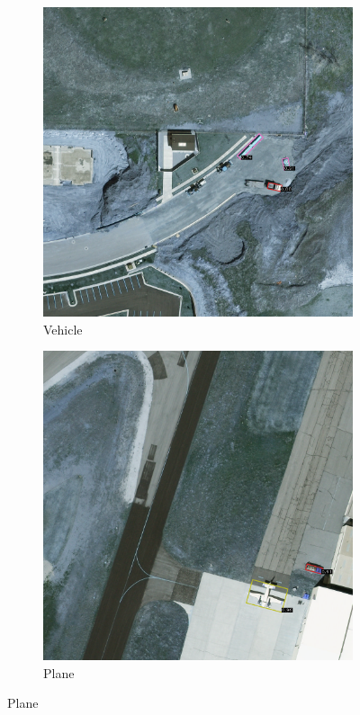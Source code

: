 \begin{figure}[h!]
    \begin{subfigure}[t]{0.38\textwidth}
        \centering
        \includegraphics[width=\linewidth]{images/015Results/02perm_exp/comp_images/rgb/427.png}
        \caption{Vehicle}
    \end{subfigure}
    \begin{subfigure}[t]{0.38\textwidth}
        \centering
        \includegraphics[width=\linewidth]{images/015Results/02perm_exp/comp_images/rgb/487.png}
        \caption{Plane}
    \end{subfigure}
    

\end{figure}
